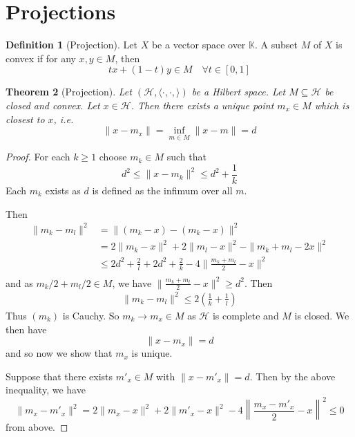 \documentclass[justified]{tufte-book}
\theoremstyle{plain}%
\newtheorem{thm}{Theorem}[chapter]
\theoremstyle{definition}
\newtheorem{defn}[thm]{Definition}
\theoremstyle{remark}
\newcommand{\K}{\mathbb{K}}
\renewcommand{\H}{\mathcal{H}}
\begin{document}
\section{Projections} %
\label{sec:projection_operators}


\begin{defn}[Projection]
  Let $X$ be a vector space over $\K$.  A subset $M$ of $X$ is convex if for any $x, y \in M$, then \[
      tx + (1-t) y \in M \quad \forall t \in [0,1]
  \]
\end{defn}

\begin{thm}[Projection]
  Let $(\H, \langle \cdot, \cdot, \rangle )$ be a Hilbert space.  Let $M \subseteq \H$ be closed and convex.  Let $x \in \H$.  Then there exists a unique point $m_x \in M$ which is closest to $x$, i.e. \[
      \| x - m_x \| = \inf_{m \in M} \| x - m \| = d
  \]  
\end{thm}

\begin{proof}
  For each $k \geq 1$ choose $m_k \in M$ such that \[
      d^2 \leq \| x - m_k \|^2 \leq d^2 + \frac{1}{k} 
  \] Each $m_k$ exists as $d$ is defined as the infimum over all $m$. 
  
  Then \begin{align*}
      \| m_k - m_l \|^2   &= \| (m_k - x) - (m_k - x) \|^2 \\
                          &= 2 \| m_k - x \|^2 + 2 \| m_l - x \|^2 - \| m_k + m_l - 2x \|^2 \\
                          &\leq 2d^2 + \frac{2}{l} + 2d^2 + \frac{2}{k} - 4 \| \frac{ m_k + m_l}{2} - x \|^2 \\
  \end{align*} and as $m_k/2 + m_l/2 \in M$, we have $\| \frac{ m_k + m_l}{2} - x \|^2  \geq d^2$.  Then 
  \begin{align*}
          \| m_k - m_l \|^2 \leq 2 \left( \frac{1}{k} + \frac{1}{l} \right)
  \end{align*} Thus $(m_k)$ is Cauchy.  So $m_k \rightarrow m_x \in M$ as $\H$ is complete and $M$ is closed.  We then have \[
      \| x - m_x \| = d 
  \] and so now we show that $m_x$ is unique.  
  
  Suppose that there exists $m'_x \in M$ with $\| x - m'_x \| = d$.  Then by the above inequality, we have \[
      \| m_x - m'_x \|^2 = 2 \| m_x - x \|^2 + 2 \| m'_x - x \|^2 - 4 \left\| \frac{m_x - m'_x}{2} - x \right\|^2 \leq 0 
  \] from above. 
\end{proof}
\end{document}
